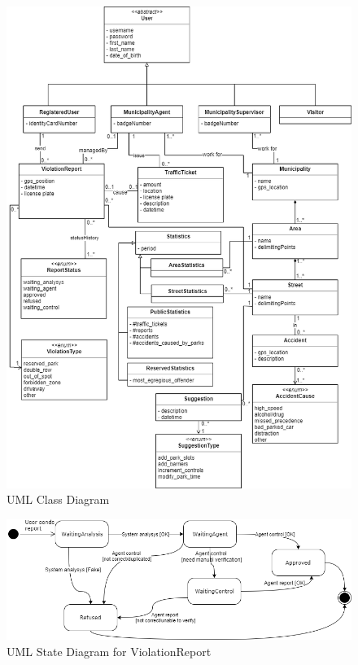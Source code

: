 \documentclass[a4paper]{report}
\begin{document}
\begin{figure}[p]
\includegraphics[width=\textwidth]{ClassDiagram2}
\caption{UML Class Diagram}
\label{fig:class-diagram}
\end{figure}
\restoregeometry

\begin{figure}[hp]
\centering
\includegraphics[width=\textwidth]{StateReport2}
\caption{UML State Diagram for ViolationReport}
\label{fig:state-diagram1}
\end{figure}
\end{document}
